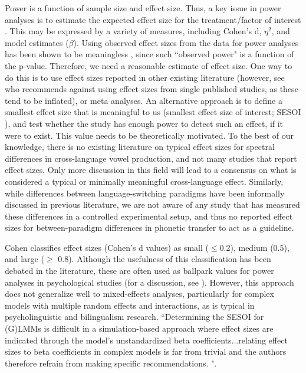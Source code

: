 \documentclass[12 pt]{article}
\begin{document}
Power is a function of sample size and effect size. Thus, a key issue in power analyses is to estimate the expected effect size for the treatment/factor of interest \citep{brysbaert2018power, kumle2021estimating}. This may be expressed by a variety of measures, including Cohen's d, $\eta ^2$, and model estimates ($\beta$). Using observed effect sizes from the data for power analyses has been shown to be meaningless \citep{hoenig2001abuse, gelman2019observed_effect_size}, since such ``observed power" is a function of the p-value. Therefore, we need a reasonable estimate of effect size. One way to do this is to use effect sizes reported in other existing literature (however, see \cite{brysbaert2018power} who recommends against using effect sizes from single published studies, as these tend to be inflated), or meta analyses. An alternative approach is to define a smallest effect size that is meaningful to us (smallest effect size of interest; SESOI \citep{kumle2021estimating}), and test whether the study has enough power to detect such an effect, if it were to exist. This value needs to be theoretically motivated. To the best of our knowledge, there is no existing literature on typical effect sizes for spectral differences in cross-language vowel production, and not many studies that report effect sizes. Only more discussion in this field will lead to a consensus on what is considered a typical or minimally meaningful cross-language effect. Similarly, while differences between language-switching paradigms have been informally discussed in previous literature, we are not aware of any study that has measured these differences in a controlled experimental setup, and thus no reported effect sizes for between-paradigm differences in phonetic transfer to act as a guideline. 

Cohen \citeyearpar{cohen1988statistical} classifies effect sizes (Cohen's d values) as small ($\leq$0.2), medium (0.5), and large ($\geq$ 0.8). Although the usefulness of this classification has been debated in the literature, these are often used as ballpark values for power analyses in psychological studies (for a discussion, see \cite{brysbaert2018power}). However, this approach does not generalize well to mixed-effects analyses, particularly for complex models with multiple random effects and interactions, as is typical in psycholinguistic and bilingualism research. ``Determining the SESOI for (G)LMMs is difficult in a simulation-based approach where effect sizes are indicated through the model’s unstandardized beta coefficients...relating effect sizes to beta coefficients in complex models is far from trivial and the authors therefore refrain from making specific recommendations. \citep{kumle2021estimating}". 
\end{document}
